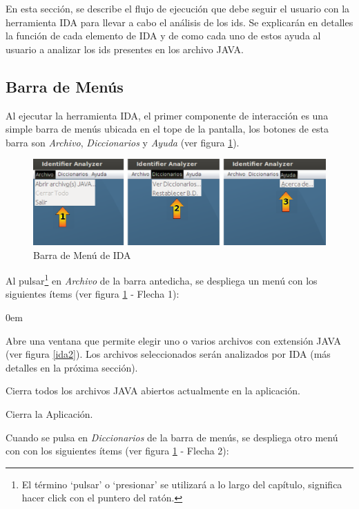 En esta sección, se describe el flujo de ejecución que debe seguir el usuario con la herramienta IDA para llevar a cabo el análisis de los ids. Se explicarán en detalles la función de cada elemento de IDA y de como cada uno de estos ayuda al usuario a analizar los ids presentes en los archivo JAVA.

\subsection{Barra de Menús}

Al ejecutar la herramienta IDA, el primer componente de interacción es una simple barra de menús ubicada en el tope de la pantalla, los botones de esta barra son \textit{Archivo}, \textit{Diccionarios} y \textit{Ayuda} (ver figura \ref{ida1}). 

\begin{figure}[t] %
\centerline{%
\includegraphics[scale= 0.46]{./cap4/ida_01.png}
}
\caption{Barra de Menú de IDA}
\label{ida1}
\end{figure}

Al pulsar\footnote[1]{El término `pulsar' o `presionar' se utilizará a lo largo del capítulo, significa hacer click con el puntero del ratón.} en \textit{Archivo} de la barra antedicha, se despliega un menú con los siguientes ítems (ver figura \ref{ida1} - Flecha 1):

\begin{description}
\itemsep0em%
\item[Abrir archivo(s) JAVA:] Abre una ventana que permite elegir uno o varios archivos con extensión JAVA (ver figura \ref{ida2}). Los archivos seleccionados serán analizados por IDA (más detalles en la próxima sección).
\item[Cerrar Todo:] Cierra todos los archivos JAVA abiertos actualmente en la aplicación.
\item[Salir:] Cierra la Aplicación.
\end{description}

Cuando se pulsa en \textit{Diccionarios} de la barra de menús, se despliega otro menú con con los siguientes ítems (ver figura \ref{ida1} - Flecha 2):


